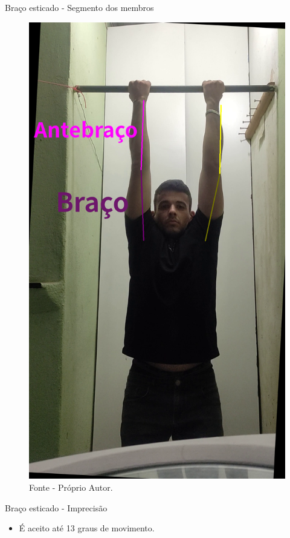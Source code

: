 \begin{frame}{Braço esticado - Segmento dos membros}
    \begin{figure}[!ht]
        \centering
            \includegraphics[scale=0.1]{img/desenvolvimento/bracoEsticado/bracoEsticado.png}
        \caption*{Fonte - Próprio Autor.}
    \end{figure}
\end{frame}

\begin{frame}{Braço esticado - Imprecisão}
    \begin{itemize}
        \item É aceito até 13 graus de movimento.
    \end{itemize}
\end{frame}

